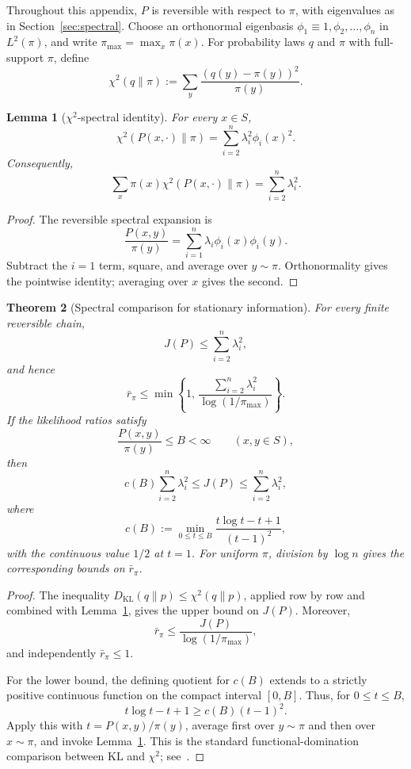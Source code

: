 \documentclass[11pt]{article}
\newtheorem{theorem}{Theorem}[section]
\newtheorem{lemma}[theorem]{Lemma}
\newcommand{\KL}{D_{\mathrm{KL}}}
\begin{document}
Throughout this appendix, \(P\) is reversible with respect to \(\pi\), with
eigenvalues as in Section~\ref{sec:spectral}.  Choose an orthonormal eigenbasis
\(\phi_1\equiv1,\phi_2,\ldots,\phi_n\) in
\(L^2(\pi)\), and write \(\pi_{\max}=\max_x\pi(x)\).  For probability laws
\(q\) and \(\pi\) with full-support \(\pi\), define
\[
  \chi^2(q\|\pi)
  :=\sum_y\frac{(q(y)-\pi(y))^2}{\pi(y)}.
\]

\begin{lemma}[\(\chi^2\)-spectral identity]
\label{lem:chi2}
For every \(x\in S\),
\[
  \chi^2(P(x,\cdot)\|\pi)
  =
  \sum_{i=2}^n\lambda_i^2\phi_i(x)^2.
\]
Consequently,
\[
  \sum_x\pi(x)\chi^2(P(x,\cdot)\|\pi)
  =\sum_{i=2}^n\lambda_i^2.
\]
\end{lemma}

\begin{proof}
The reversible spectral expansion is
\[
  \frac{P(x,y)}{\pi(y)}
  =
  \sum_{i=1}^n\lambda_i\phi_i(x)\phi_i(y).
\]
Subtract the \(i=1\) term, square, and average over \(y\sim\pi\).
Orthonormality gives the pointwise identity; averaging over \(x\) gives
the second.
\end{proof}

\begin{theorem}[Spectral comparison for stationary information]
\label{thm:spectral-comparison}
For every finite reversible chain,
\[
  J(P)\le\sum_{i=2}^n\lambda_i^2,
\]
and hence
\[
  \bar r_\pi
  \le
  \min\!\left\{
    1,\,
    \frac{\sum_{i=2}^n\lambda_i^2}
         {\log(1/\pi_{\max})}
  \right\}.
\]
If the likelihood ratios satisfy
\[
  \frac{P(x,y)}{\pi(y)}\le B<\infty
  \qquad(x,y\in S),
\]
then
\[
  c(B)\sum_{i=2}^n\lambda_i^2
  \le J(P)\le\sum_{i=2}^n\lambda_i^2,
\]
where
\[
  c(B):=
  \min_{0\le t\le B}
  \frac{t\log t-t+1}{(t-1)^2},
\]
with the continuous value \(1/2\) at \(t=1\).  For uniform \(\pi\), division
by \(\log n\) gives the corresponding bounds on \(\bar r_\pi\).
\end{theorem}

\begin{proof}
The inequality \(\KL(q\|p)\le\chi^2(q\|p)\), applied row by row and
combined with Lemma~\ref{lem:chi2}, gives the upper bound on \(J(P)\).
Moreover,
\[
  \bar r_\pi
  \le\frac{J(P)}{\log(1/\pi_{\max})},
\]
and independently \(\bar r_\pi\le1\).

For the lower bound, the defining quotient for \(c(B)\) extends to a
strictly positive continuous function on the compact interval \([0,B]\).
Thus, for \(0\le t\le B\),
\[
  t\log t-t+1\ge c(B)(t-1)^2.
\]
Apply this with \(t=P(x,y)/\pi(y)\), average first over \(y\sim\pi\) and
then over \(x\sim\pi\), and invoke Lemma~\ref{lem:chi2}.  This is the
standard functional-domination comparison between KL and \(\chi^2\);
see~\cite{SasonVerdu2016,NishiyamaSason2020}.
\end{proof}
\end{document}
